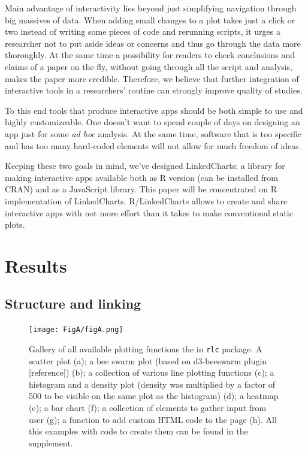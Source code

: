 \documentclass[twocolumn,10pt]{article}
\begin{document}
Main advantage of interactivity lies beyond just simplifying navigation through big massives of data. When adding small changes to a plot takes just a click or two instead of writing some pieces of code and rerunning scripts, it urges a researcher not to put aside ideas or concerns and thus go through the data more thoroughly. At the same time a possibility for readers to check conclusions and claims of a paper on the fly, without going through all the script and analysis, makes the paper more credible. Therefore, we believe that further integration of interactive tools in a researchers' routine can strongly improve quality of studies.

To this end tools that produce interactive apps should be both simple to use and highly customizeable. One doesn't want to spend couple of days on designing an app just for some \emph{ad hoc} analysis. At the same time, software that is too specific and has too many hard-coded elements will not allow for much freedom of ideas.

Keeping these two goals in mind, we've designed LinkedCharts: a library for making interactive apps available both as R version (can be installed from CRAN) and as a JavaScript library. This paper will be concentrated on R implementation of LinkedCharts. R/LinkedCharts allows to create and share interactive apps with not more effort than it takes to make conventional static plots.

\section{Results}
\subsection{Structure and linking}
\begin{figure}
	\texttt{[image: FigA/figA.png]}
	\caption{Gallery of all available plotting functions the in \texttt{rlc} package. A scatter plot (a); a bee swarm plot (based on d3-beeswarm plugin [reference]) (b); a collection of various line plotting functions (c); a histogram and a density plot (density was multiplied by a factor of 500 to be visible on the same plot as the histogram) (d); a heatmap (e); a bar chart (f); a collection of elements to gather input from user (g); a function to add custom HTML code to the page (h). All this examples with code to create them can be found in the supplement.}
	\label{FigA}
\end{figure}
\end{document}
